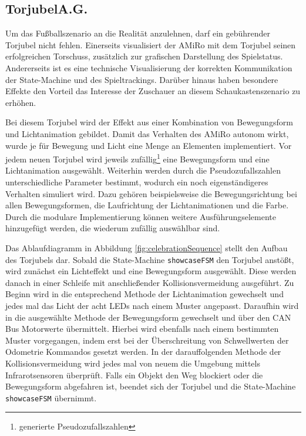\subsection[Torjubel]{Torjubel\hfill {\normalsize A.G.}} %
Um das Fußballszenario an die Realität anzulehnen, darf ein gebührender Torjubel nicht fehlen. Einerseits visualisiert der AMiRo mit dem Torjubel seinen erfolgreichen Torschuss, zusätzlich zur grafischen Darstellung des Spielstatus. Andererseits ist es eine technische Visualisierung der korrekten Kommunikation der State-Machine und des Spieltrackings. Darüber hinaus haben besondere Effekte den Vorteil das Interesse der Zuschauer an diesem Schaukastenszenario zu erhöhen.

Bei diesem Torjubel wird der Effekt aus einer Kombination von Bewegungsform und Lichtanimation gebildet. Damit das Verhalten des AMiRo autonom wirkt, wurde je für Bewegung und Licht eine Menge an Elementen implementiert. Vor jedem neuen Torjubel wird jeweils zufällig\footnote{generierte Pseudozufallszahlen} eine Bewegungsform und eine Lichtanimation ausgewählt. Weiterhin werden durch die Pseudozufallszahlen unterschiedliche Parameter bestimmt, wodurch ein noch eigenständigeres Verhalten simuliert wird. Dazu gehören beispielsweise die Bewegungsrichtung bei allen Bewegungsformen, die Laufrichtung der Lichtanimationen und die Farbe. Durch die modulare Implementierung können weitere Ausführungselemente hinzugefügt werden, die wiederum zufällig auswählbar sind.

Das Ablaufdiagramm in Abbildung \ref{fig:celebrationSequence} stellt den Aufbau des Torjubels dar. Sobald die State-Machine \texttt{showcaseFSM} den Torjubel anstößt, wird zunächst ein Lichteffekt und eine Bewegungsform ausgewählt. Diese werden danach in einer Schleife mit anschließender Kollisionsvermeidung ausgeführt. Zu Beginn wird in die entsprechend Methode der Lichtanimation gewechselt und jedes mal das Licht der acht LEDs nach einem Muster angepasst. Daraufhin wird in die ausgewählte Methode der Bewegungsform gewechselt und über den CAN Bus Motorwerte übermittelt. Hierbei wird ebenfalls nach einem bestimmten Muster vorgegangen, indem erst bei der Überschreitung von Schwellwerten der Odometrie Kommandos gesetzt werden. In der darauffolgenden Methode der Kollisionsvermeidung wird jedes mal von neuem die Umgebung mittels Infrarotsensoren überprüft. Falls ein Objekt den Weg blockiert oder die Bewegungsform abgefahren ist, beendet sich der Torjubel und die State-Machine \texttt{showcaseFSM} übernimmt.

